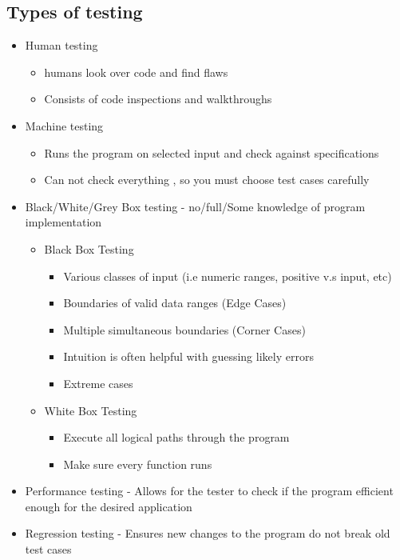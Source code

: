 \documentclass{article}
\begin{document}
\subsection{Types of testing}
\begin{itemize}
\item Human testing 
\begin{itemize}
\item humans look over code and find flaws
\item Consists of code inspections and walkthroughs 
\end{itemize}
\item Machine testing 
\begin{itemize}
\item Runs the program on selected input and check against specifications
\item Can not check everything , so you must choose test cases carefully  
\end{itemize}
\item Black/White/Grey Box testing - no/full/Some knowledge of program implementation
\begin{itemize}
\item Black Box Testing 
\begin{itemize}
\item Various classes of input (i.e numeric ranges, positive v.s input, etc)
\item Boundaries of valid data ranges (Edge Cases)
\item Multiple simultaneous boundaries (Corner Cases)
\item Intuition is often helpful with guessing likely errors
\item Extreme cases 
\end{itemize}
\item White Box Testing 
\begin{itemize}
\item Execute all logical paths through the program 
\item Make sure every function runs 
\end{itemize}
\end{itemize}
\item Performance testing - Allows for the tester to check if the program efficient enough for the desired application
\item Regression testing - Ensures new changes to the program do not break old test cases 
\end{itemize}
\end{document}

